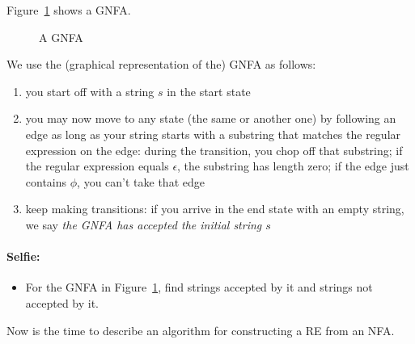 Figure~\ref{gfsa1} shows a GNFA.

\begin{figure}[h]
\caption{A GNFA\label{gfsa1}}
\end{figure}

We use the (graphical representation of the) GNFA as follows:

\begin{enumerate}
\item you start off with a string $s$ in the start state
\item you may now move to any state (the same or another one) by
following an edge as long as your string starts with a substring that
matches the regular expression on the edge: during the transition, you
chop off that substring; if the regular expression equals $\epsilon$,
the substring has length zero; if the edge just contains $\phi$, you
can't take that edge
\item keep making transitions: if you arrive in the end state with an
empty string, we say {\em the GNFA has accepted the initial string $s$}
\end{enumerate}

\paragraph{Selfie:}
\begin{itemize}
\item[]
For the GNFA in Figure~\ref{gfsa1}, find strings accepted by it and
strings not accepted by it.
\end{itemize}


Now is the time to describe an algorithm for constructing a RE from an NFA.

